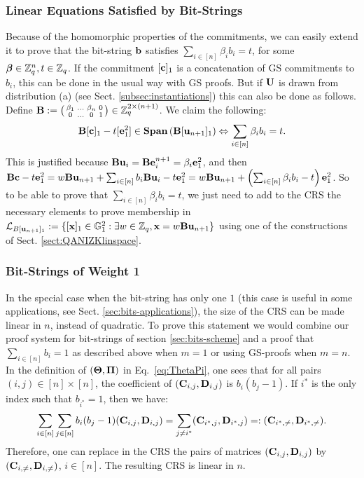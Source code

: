 \subsubsection{Linear Equations Satisfied by Bit-Strings}\label{sec:linear-eqs-bitstrings}
Because of the homomorphic properties of the commitments, 
we can easily extend it to prove that the bit-string $ \mathbf{b}$ satisfies $\sum_{i \in [n]} \beta_i b_i=t$, for some ${\boldsymbol \beta} \in \mathbb{Z}_q^{n}, t\in \mathbb{Z}_q$. 
If the commitment $[\mathbf{c}]_1$ is a concatenation of GS commitments to $b_i$, this can be done in the usual way with GS proofs. 
But if $\mathbf{{U}}$ is drawn from distribution (a) (see Sect. \ref{subsec:instantiations})
this can also be done as follows. 
Define $\mathbf{{B}}:=\left(\begin{smallmatrix} \beta_1 & \ldots & \beta_n & 0\\ 0 & \ldots & 0 &1\end{smallmatrix}\right)
\in \mathbb{Z}_q^{2\times (n+1)}$. %
We claim the following:
$$\mathbf{{B}}[\mathbf{c}]_1- t [\mathbf{e}^{2}_{1}] \in \mathbf{Span}\left(\mathbf{{B}}[\mathbf{u}_{n+1}]_1\right) \Leftrightarrow \sum_{i \in [n]}\beta_i  b_i=t.$$
This is justified because
$\mathbf{{B}}\mathbf{u}_i = \mathbf{{B}}\mathbf{e}^{n+1}_i=\beta_i\mathbf{e}_1^{2}$, and then
$ \mathbf{{B}}\mathbf{c}- t \mathbf{e}^{2}_{1}=w  \mathbf{{B}} \mathbf{u}_{n+1}+ \sum_{i \in [n]} b_i \mathbf{{B}} \mathbf{u}_{i} - t \mathbf{e}^{2}_1=w\mathbf{{B}}\mathbf{u}_{n+1}+\left(\sum_{i\in[n]}\beta_i b_i-t\right)\mathbf{e}_1^2$.
So to be able to prove that $\sum_{i \in [n]} \beta_i b_i=t$, we just need to add to the CRS the necessary elements to prove membership 
in $\mathcal{L}_{B[\mathbf{u}_{n+1}]_1}:=\{ [\mathbf{x}]_1 \in \mathbb{G}_1^2: \exists w \in \mathbb{Z}_q,  \mathbf{x} = w\mathbf{{B}}\mathbf{u}_{n+1} \}$ using one of the constructions of Sect. 
\ref{sect:QANIZKlinspace}.

\subsubsection{Bit-Strings of Weight 1}  In the special
case when the bit-string has only one $1$ (this case is useful in some applications, see Sect. \ref{sec:bits-applications}),  the size of the CRS can be made linear in $n$, instead of quadratic.
To prove this statement we would combine our proof system for bit-strings of section \ref{sec:bits-scheme} and a proof that  $\sum_{i \in [n]} b_i=1$ as described above
when $m=1$ or using GS-proofs when $m=n$.
In the definition of $(\mathbf{{\Theta}},\mathbf{{\Pi}})$ in Eq.~\ref{eq:ThetaPi}, one 
sees that for all pairs $(i,j) \in [n] \times [n]$, the coefficient of $(\mathbf{C}_{i,j},\mathbf{D}_{i,j})$ is $b_i(b_j-1)$.
If $i^*$ is the only index such that $b_{i^*}=1$, then we have:
$$\sum_{i \in [n]} \sum_{j \in [n]} b_i(b_j-1) (\mathbf{C}_{i,j},\mathbf{D}_{i,j}) = \sum_{j \neq i^*} (\mathbf{C}_{i^*,j},\mathbf{D}_{i^*,j})=: (\mathbf{C}_{i^*,\neq},\mathbf{D}_{i^*,\neq}).$$
Therefore, one can replace in the CRS the pairs of matrices  $ (\mathbf{C}_{i,j},\mathbf{D}_{i,j})$ by  $(\mathbf{C}_{i,\neq},\mathbf{D}_{i,\neq})$, $i \in [n]$. The resulting CRS is linear in $n$.

